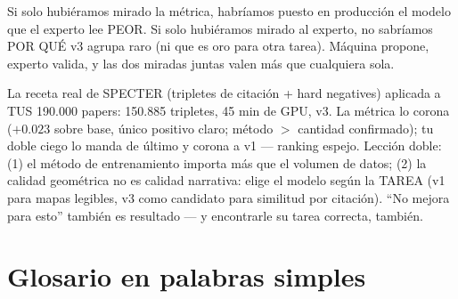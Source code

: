 \documentclass[11pt,a4paper]{article}
\begin{document}
\begin{ojo}
Si solo hubiéramos mirado la métrica, habríamos puesto en producción el modelo que el
experto lee PEOR. Si solo hubiéramos mirado al experto, no sabríamos POR QUÉ v3 agrupa
raro (ni que es oro para otra tarea). Máquina propone, experto valida, y las dos
miradas juntas valen más que cualquiera sola.
\end{ojo}

\begin{resumen}
La receta real de SPECTER (tripletes de citación + hard negatives) aplicada a TUS
190.000 papers: 150.885 tripletes, 45 min de GPU, v3. La métrica lo corona ($+0.023$
sobre base, único positivo claro; método $>$ cantidad confirmado); tu doble ciego lo
manda de último y corona a v1 --- ranking espejo. Lección doble: (1) el método de
entrenamiento importa más que el volumen de datos; (2) la calidad geométrica no es
calidad narrativa: elige el modelo según la TAREA (v1 para mapas legibles, v3 como
candidato para similitud por citación). ``No mejora para esto'' también es resultado
--- y encontrarle su tarea correcta, también.
\end{resumen}
\clearpage
{}
{}

\section{Glosario en palabras simples}
\end{document}
